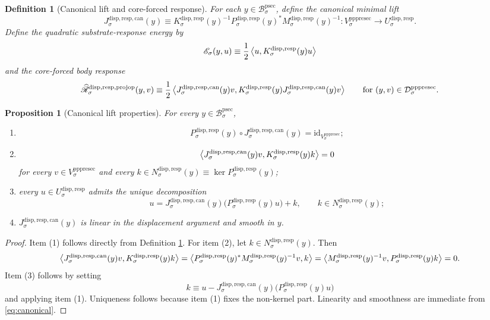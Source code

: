 \documentclass[11pt]{article}
\newcommand{\ProtoSectionBody}[1]{\mathcal B_{#1}^{\mathrm{psec}}}
\newcommand{\PrePreProtoSectionVertical}[1]{V_{#1}^{\mathrm{pppresec}}}
\newcommand{\PrePreProtoSectionResidualBody}[1]{\mathcal D_{#1}^{\mathrm{pppresec}}}
\newcommand{\SubstrateCarrier}[1]{U_{#1}^{\mathrm{disp,resp}}}
\newcommand{\SubstrateProjection}[1]{P_{#1}^{\mathrm{disp,resp}}}
\newcommand{\SubstrateOperator}[1]{K_{#1}^{\mathrm{disp,resp}}}
\newcommand{\SubstrateKernel}[1]{N_{#1}^{\mathrm{disp,resp}}}
\newcommand{\SchurResponse}[1]{M_{#1}^{\mathrm{disp,resp}}}
\newcommand{\CanonicalLift}[1]{J_{#1}^{\mathrm{disp,resp,can}}}
\newcommand{\CoreForcedBodyResponse}[1]{\widehat{\mathscr R}_{#1}^{\mathrm{disp,resp,projop}}}
\newtheorem{definition}{Definition}
\newtheorem{proposition}{Proposition}
\begin{document}
\begin{definition}[Canonical lift and core-forced response]
\label{def:canonical}
For each \(y\in\ProtoSectionBody{\sigma}\), define the \emph{canonical minimal lift}
\begin{equation}
\CanonicalLift{\sigma}(y)
\equiv
\SubstrateOperator{\sigma}(y)^{-1}\SubstrateProjection{\sigma}(y)^*
\SchurResponse{\sigma}(y)^{-1}
:
\PrePreProtoSectionVertical{\sigma}\to\SubstrateCarrier{\sigma}.
\label{eq:canonical}
\end{equation}
Define the quadratic substrate-response energy by
\[
\mathscr E_{\sigma}(y,u)
\equiv
\frac{1}{2}
\ev{u,\SubstrateOperator{\sigma}(y)u}
\]
and the \emph{core-forced body response}
\begin{equation}
\CoreForcedBodyResponse{\sigma}(y,v)
\equiv
\frac{1}{2}
\ev{
\CanonicalLift{\sigma}(y)v,
\SubstrateOperator{\sigma}(y)\CanonicalLift{\sigma}(y)v
}
\qquad
\text{for }
(y,v)\in\PrePreProtoSectionResidualBody{\sigma}.
\label{eq:coreresponse}
\end{equation}
\end{definition}

\begin{proposition}[Canonical lift properties]
\label{prop:canonical}
For every \(y\in\ProtoSectionBody{\sigma}\),
\begin{enumerate}
    \item
    \[
    \SubstrateProjection{\sigma}(y)\circ\CanonicalLift{\sigma}(y)
    =
    \mathrm{id}_{\PrePreProtoSectionVertical{\sigma}};
    \]
    \item
    \[
    \ev{
    \CanonicalLift{\sigma}(y)v,
    \SubstrateOperator{\sigma}(y)k
    }
    =
    0
    \]
    for every \(v\in\PrePreProtoSectionVertical{\sigma}\) and every \(k\in\SubstrateKernel{\sigma}(y)\equiv\ker\SubstrateProjection{\sigma}(y)\);
    \item every \(u\in\SubstrateCarrier{\sigma}\) admits the unique decomposition
    \[
    u
    =
    \CanonicalLift{\sigma}(y)\bigl(\SubstrateProjection{\sigma}(y)u\bigr)
    +
    k,
    \qquad
    k\in\SubstrateKernel{\sigma}(y);
    \]
    \item \(\CanonicalLift{\sigma}(y)\) is linear in the displacement argument and smooth in \(y\).
\end{enumerate}
\end{proposition}

\begin{proof}
Item (1) follows directly from Definition \ref{def:canonical}. For item (2), let \(k\in\SubstrateKernel{\sigma}(y)\). Then
\[
\ev{
\CanonicalLift{\sigma}(y)v,
\SubstrateOperator{\sigma}(y)k
}
=
\ev{
\SubstrateProjection{\sigma}(y)^*\SchurResponse{\sigma}(y)^{-1}v,
k
}
=
\ev{
\SchurResponse{\sigma}(y)^{-1}v,
\SubstrateProjection{\sigma}(y)k
}
=
0.
\]
Item (3) follows by setting
\[
k\equiv u-\CanonicalLift{\sigma}(y)\bigl(\SubstrateProjection{\sigma}(y)u\bigr)
\]
and applying item (1). Uniqueness follows because item (1) fixes the non-kernel part. Linearity and smoothness are immediate from \eqref{eq:canonical}.
\end{proof}
\end{document}
